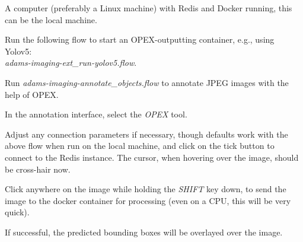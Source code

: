 \documentclass[a4paper]{book}
\begin{document}
\begin{tight_itemize}
  \item A computer (preferably a Linux machine) with Redis\cite{redis} and Docker\cite{docker} running,
  this can be the local machine.
  \item Run the following flow to start an OPEX-outputting container, e.g., using Yolov5: \\
  \textit{adams-imaging-ext\_run-yolov5.flow}.
  \item Run \textit{adams-imaging-annotate\_objects.flow} to annotate JPEG images with the help of OPEX.
  \begin{tight_itemize}
    \item In the annotation interface, select the \textit{OPEX} tool.
    \item Adjust any connection parameters if necessary, though defaults work with the above flow when run on the
    local machine, and click on the tick button to connect to the Redis instance. The cursor, when hovering over
    the image, should be cross-hair now.
    \item Click anywhere on the image while holding the \textit{SHIFT} key down, to send the image to the docker
    container for processing (even on a CPU, this will be very quick).
    \item If successful, the predicted bounding boxes will be overlayed over the image.
  \end{tight_itemize}
\end{tight_itemize}


\end{document}
